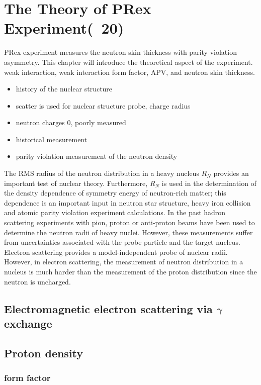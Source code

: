 \chapter{The Theory of PRex Experiment(~20)}
PRex experiment measures the neutron skin thickness with parity violation asymmetry. This chapter will introduce the theoretical aspect of the experiment. weak interaction, weak interaction form factor, APV, and neutron skin thickness.
\begin{itemize}
    \item history of the nuclear structure
    \item scatter is used for nuclear structure probe, charge radius 
    \item neutron charges 0, poorly measured
    \item historical measurement 
    \item parity violation measurement of the neutron density
\end{itemize}

The RMS radius of the  neutron distribution in a heavy nucleus  $R_N$ provides an important test of nuclear theory. Furthermore,   $R_N$ is used in the determination of  the density dependence of symmetry energy of neutron-rich matter; this dependence is an  important input in   neutron star structure, heavy iron collision and atomic parity violation experiment calculations. In the past hadron scattering experiments with pion, proton or anti-proton beams have been used to determine the neutron radii of heavy nuclei. However, these measurements suffer from uncertainties associated with the probe particle and the target nucleus. Electron scattering provides a model-independent probe of nuclear radii.  However, in electron scattering, the measurement of neutron distribution in a nucleus  is much harder than the measurement of the proton distribution  since the neutron is uncharged. 

\section{Electromagnetic electron scattering via $\gamma$ exchange}



\section{Proton density}
\subsection{form factor}
